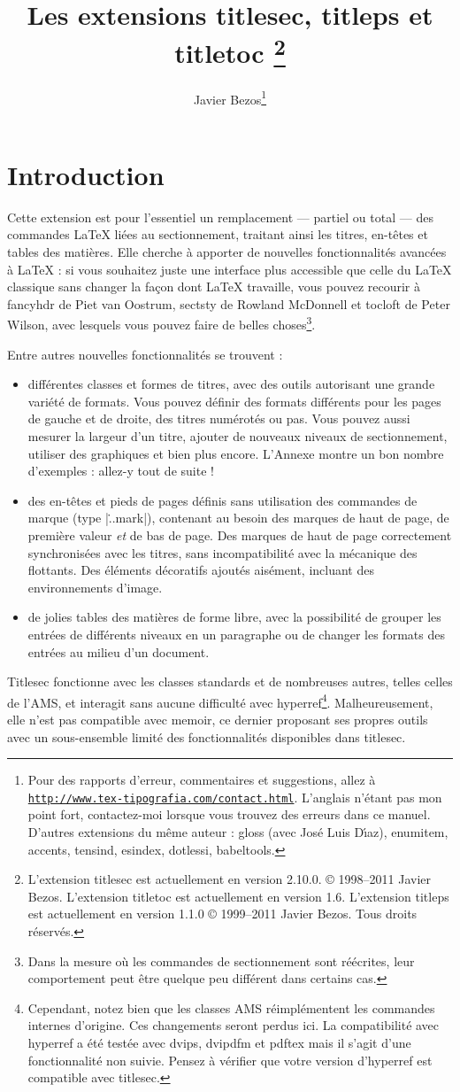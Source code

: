 \documentclass[a4paper]{ltxguide}
\title{Les extensions \textsf{titlesec}, \textsf{titleps} et \textsf{titletoc} 
\footnote{L'extension \textsf{titlesec} est actuellement en version 2.10.0.  
\copyright{} 1998--2011 Javier Bezos. L'extension \textsf{titletoc} est
actuellement en version 1.6. L'extension \textsf{titleps} est actuellement en
version 1.1.0 \copyright{} 1999--2011 Javier Bezos. Tous droits réservés.}}
\author{Javier Bezos\footnote{Pour des rapports d'erreur, commentaires et 
suggestions, allez à \href{http://www.tex-tipografia.com/contact.html}%
{\texttt{http://www.tex-tipografia.com/contact.html}}.  L'anglais n'étant pas
mon point fort, contactez-moi lorsque vous trouvez des erreurs dans ce manuel.  
D'autres extensions du même auteur : \textsf{gloss} (avec Jos\'e Luis 
D\'{\i}az), \textsf{enumitem, accents, tensind, esindex, dotlessi, 
babeltools}.}}
\date{\docdate}
\begin{document}
\maketitle
\tableofcontents
\section{Introduction}

Cette extension est pour l'essentiel un remplacement --- partiel ou total ---
des commandes \LaTeX{} liées au sectionnement, traitant ainsi les titres, 
en-têtes et tables des matières. Elle cherche à apporter de nouvelles
fonctionnalités avancées à \LaTeX{} : si vous souhaitez juste une interface
plus accessible que celle du \LaTeX{} classique sans changer la façon dont
\LaTeX{} travaille, vous pouvez recourir à \textsf{fancyhdr} de Piet van 
Oostrum, \textsf{sectsty} de Rowland McDonnell et \textsf{tocloft} de Peter
Wilson, avec lesquels vous pouvez faire de belles choses\footnote{Dans la
mesure où les commandes de sectionnement sont réécrites, leur comportement peut
être quelque peu différent dans certains cas.}.

Entre autres nouvelles fonctionnalités se trouvent :
\begin{itemize}
\item différentes classes et \og formes\fg{} de titres, avec des outils
autorisant une grande variété de formats. Vous pouvez définir des formats
différents pour les pages de gauche et de droite, des titres numérotés ou pas.
Vous pouvez aussi mesurer la largeur d'un titre, ajouter de nouveaux niveaux
de sectionnement, utiliser des graphiques et bien plus encore. L'Annexe montre
un bon nombre d'exemples : allez-y tout de suite !

\item des en-têtes et pieds de pages définis sans utilisation des commandes de
marque (type |\...mark|), contenant au besoin des marques de haut de page, de
première valeur \emph{et} de bas de page. Des marques de haut de page
correctement synchronisées avec les titres, sans incompatibilité avec la
mécanique des flottants. Des éléments décoratifs ajoutés aisément, incluant des
environnements d'image.

\item de jolies tables des matières de forme libre, avec la possibilité de
grouper les entrées de différents niveaux en un paragraphe ou de changer les
formats des entrées au milieu d'un document. 
\end{itemize}
\textsf{Titlesec} fonctionne avec les classes standards et de nombreuses
autres, telles celles de l'AMS, et interagit sans aucune difficulté avec 
\textsf{hyperref}\footnote{Cependant, notez bien que les classes AMS
réimplémentent les commandes internes d'origine. Ces changements seront perdus
ici. La compatibilité avec \textsf{hyperref} a été testée avec \textsf{dvips}, 
\textsf{dvipdfm} et \textsf{pdftex} mais il s'agit d'une fonctionnalité non 
suivie. Pensez à vérifier que votre version d'\textsf{hyperref} est compatible 
avec \textsf{titlesec}.}. Malheureusement, elle n'est pas compatible avec 
\textsf{memoir}, ce dernier proposant ses propres outils avec un sous-ensemble
limité des fonctionnalités disponibles dans \textsf{titlesec}.
\end{document}
